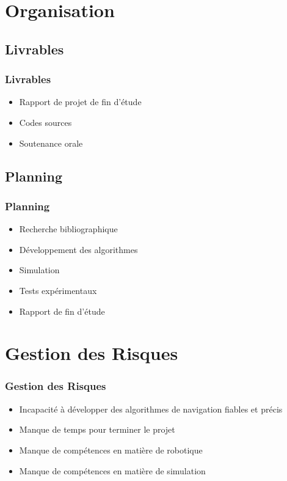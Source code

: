 \documentclass{beamer}
\begin{document}
	\section{Organisation}
		\subsection{Livrables}
			\begin{frame}
				\frametitle{Livrables}
				\begin{itemize}
					\item Rapport de projet de fin d'étude
					\item Codes sources
					\item Soutenance orale
				\end{itemize}
			\end{frame}
		\subsection{Planning}
			\begin{frame}
				\frametitle{Planning}
				\begin{itemize}
					\item Recherche bibliographique
					\item Développement des algorithmes
					\item Simulation
					\item Tests expérimentaux
					\item Rapport de fin d'étude
				\end{itemize}
			\end{frame}
	\section{Gestion des Risques}
	    \begin{frame}
	        \frametitle{Gestion des Risques}
	           \begin{itemize}
                \item Incapacité à développer des algorithmes de navigation fiables et précis
                \item Manque de temps pour terminer le projet
                \item Manque de compétences en matière de robotique
                \item Manque de compétences en matière de simulation
    	       \end{itemize}
	    \end{frame}
\end{document}
